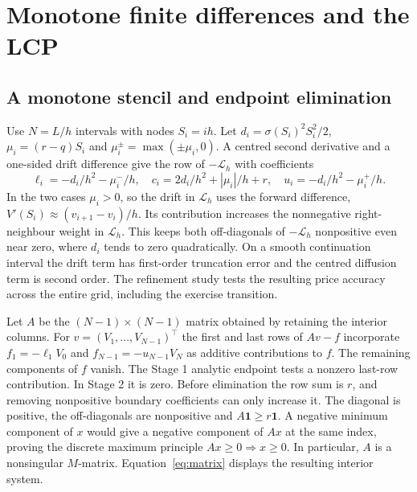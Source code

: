 \documentclass[11pt,a4paper]{article}
\numberwithin{equation}{section}
\begin{document}
\section{Monotone finite differences and the LCP}\label{sec:discrete}
\subsection{A monotone stencil and endpoint elimination}\label{sec:stencil}
Use $N=L/h$ intervals with nodes $S_i=ih$. Let
$d_i=\sigma(S_i)^2 S_i^2/2$, $\mu_i=(r-q)S_i$ and
$\mu_i^\pm=\max(\pm \mu_i,0)$. A centred second derivative and a one-sided
drift difference give the row of $-\mathcal L_h$ with coefficients
\begin{equation}\label{eq:stencil}
 \ell_i=-d_i/h^2-\mu_i^-/h,\quad
 c_i=2d_i/h^2+|\mu_i|/h+r,\quad
 u_i=-d_i/h^2-\mu_i^+/h.
\end{equation}
In the two cases $\mu_i>0$, so the drift in $\mathcal L_h$ uses the forward
difference, $V'(S_i)\approx(v_{i+1}-v_i)/h$. Its contribution increases
the nonnegative right-neighbour weight in $\mathcal L_h$.
This keeps both off-diagonals of $-\mathcal L_h$ nonpositive
even near zero, where $d_i$ tends to zero quadratically. On a smooth
continuation interval the drift term has first-order truncation error and
the centred diffusion term is second order. The refinement study tests the
resulting price accuracy across the entire grid, including the exercise
transition.

Let $A$ be the $(N-1)\times(N-1)$ matrix obtained by retaining the interior
columns. For $v=(V_1,\dots,V_{N-1})^\top$ the first and last rows of
$Av-f$ incorporate $f_1=-\ell_1V_0$ and
$f_{N-1}=-u_{N-1}V_N$ as additive contributions to $f$.
The remaining components of $f$ vanish. The Stage 1 analytic endpoint
tests a nonzero last-row contribution. In Stage 2 it is zero. Before
elimination the row sum is $r$, and removing nonpositive boundary
coefficients can only increase it. The diagonal is positive, the
off-diagonals are nonpositive and $A\mathbf1\ge r\mathbf1$.
A negative minimum component of $x$ would give a negative component
of $Ax$ at the same index, proving the discrete maximum principle
$Ax\ge0\Rightarrow x\ge0$. In particular, $A$ is a nonsingular
$M$-matrix. Equation~\eqref{eq:matrix} displays the resulting interior system.
\end{document}
